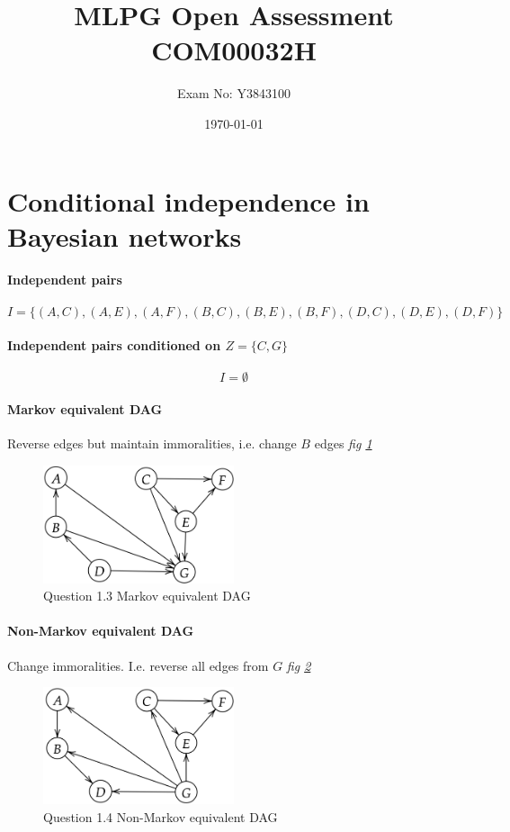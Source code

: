 \documentclass[11pt,a4paper,titlepage]{article}
\title{MLPG Open Assessment COM00032H}
\author{Exam No: Y3843100}
\date{\today}
\begin{document}
\maketitle


\section{Conditional independence in Bayesian networks}

\paragraph{Independent pairs}
\[I = \{(A,C),(A,E),(A,F),(B,C),(B,E),(B,F),(D,C),(D,E),(D,F)\}\]

\paragraph{Independent pairs conditioned on \(Z = \{C,G\}\)}

\[I = \emptyset\]

\paragraph{Markov equivalent DAG}
Reverse edges but maintain immoralities, i.e. change \(B\) edges \textit{fig \ref{fig:1.3}}

\begin{figure}[htb]
  \centering
    \includegraphics[width=0.5\textwidth]{../q1/fig13.png}
    \caption{Question 1.3 Markov equivalent DAG}
  \label{fig:1.3}
\end{figure}

\paragraph{Non-Markov equivalent DAG}
Change immoralities. I.e. reverse all edges from \(G\) \textit{fig \ref{fig:1.4}}
\begin{figure}[htb]
  \centering
    \includegraphics[width=0.5\textwidth]{../q1/fig14.png}
    \caption{Question 1.4 Non-Markov equivalent DAG}
  \label{fig:1.4}
\end{figure}
\end{document}
